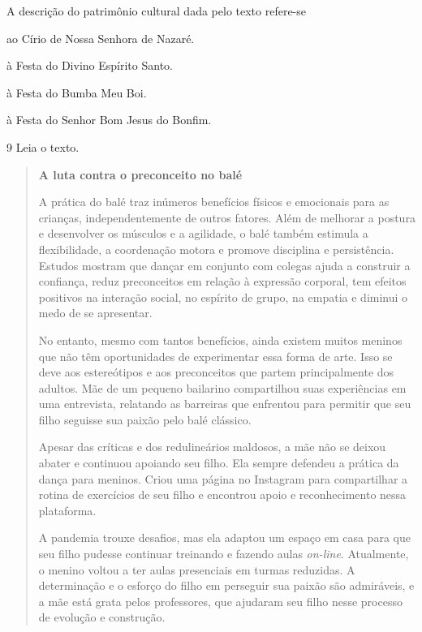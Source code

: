 \begin{escolha}
\begin{escolha}
\begin{escolha}
\begin{quote}
\end{quote}

A descrição do patrimônio cultural dada pelo texto refere-se

\begin{escolha}
\item
  ao Círio de Nossa Senhora de Nazaré.
\item
  à Festa do Divino Espírito Santo.
\item
  à Festa do Bumba Meu Boi.
\item
  à Festa do Senhor Bom Jesus do Bonfim.
\end{escolha}

\num{9} Leia o texto.

\begin{quote}
\textbf{A luta contra o preconceito no balé}

A prática do balé traz inúmeros benefícios físicos e emocionais para as crianças, independentemente de 
outros fatores. Além de melhorar a postura e desenvolver os músculos e a agilidade, o balé também estimula 
a flexibilidade, a coordenação motora e promove disciplina e persistência. Estudos mostram que dançar em 
conjunto com colegas ajuda a construir a confiança, reduz preconceitos em relação à expressão corporal, tem 
efeitos positivos na interação social, no espírito de grupo, na empatia e diminui o medo de se apresentar.

No entanto, mesmo com tantos benefícios, ainda existem muitos meninos que não têm oportunidades de 
experimentar essa forma de arte. Isso se deve aos estereótipos e aos preconceitos que partem principalmente 
dos adultos. Mãe de um pequeno bailarino compartilhou suas experiências em uma entrevista, relatando as 
barreiras que enfrentou para permitir que seu filho seguisse sua paixão pelo balé clássico.

Apesar das críticas e dos redulineários maldosos, a mãe não se deixou abater e continuou apoiando seu filho. 
Ela sempre defendeu a prática da dança para meninos. Criou uma página no Instagram para compartilhar a rotina de exercícios de seu filho e encontrou apoio e reconhecimento nessa plataforma.

A pandemia trouxe desafios, mas ela adaptou um espaço em casa para que seu filho pudesse continuar 
treinando e fazendo aulas \textit{on-line}. Atualmente, o menino voltou a ter aulas presenciais em turmas 
reduzidas. A determinação e o esforço do filho em perseguir sua paixão são admiráveis, e a mãe está grata pelos professores, que ajudaram seu filho nesse processo de evolução e construção.


\end{quote}
\end{escolha}
\end{escolha}
\end{escolha}
